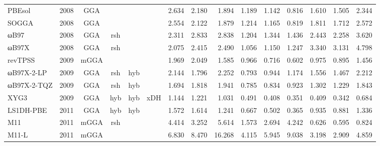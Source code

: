 \begin{landscape}
\begin{longtable}{lcccccrrrrrrrrr}
    PBEsol           & 2008 & GGA  &          &             &           & 2.634             & 2.180             & 1.894  & 1.189              & 1.142             & 0.816  & 1.610   & 1.505 & 2.344 \\
    SOGGA            & 2008 & GGA  &          &             &           & 2.554             & 2.122             & 1.879  & 1.214              & 1.165             & 0.819  & 1.811   & 1.712 & 2.572 \\
    ωB97             & 2008 & GGA  & rsh      &             &           & 2.311             & 2.833             & 2.838  & 1.204              & 1.344             & 1.436  & 2.443   & 2.258 & 3.620 \\
    ωB97X            & 2008 & GGA  & rsh      &             &           & 2.075             & 2.415             & 2.490  & 1.056              & 1.150             & 1.247  & 3.340   & 3.131 & 4.798 \\
    revTPSS          & 2009 & mGGA &          &             &           & 1.969             & 2.049             & 1.585  & 0.966              & 0.716             & 0.602  & 0.975   & 0.895 & 1.456 \\
    ωB97X-2-LP       & 2009 & GGA  & rsh      & hyb         &           & 2.144             & 1.796             & 2.252  & 0.793              & 0.944             & 1.174  & 1.556   & 1.467 & 2.212 \\
    ωB97X-2-TQZ      & 2009 & GGA  & rsh      & hyb         &           & 1.694             & 1.818             & 1.941  & 0.785              & 0.834             & 0.923  & 1.302   & 1.229 & 1.843 \\
    XYG3             & 2009 & GGA  & hyb      & hyb         & xDH       & 1.144             & 1.221             & 1.031  & 0.491              & 0.408             & 0.351  & 0.409   & 0.342 & 0.684 \\
    LS1DH-PBE        & 2011 & GGA  & hyb      & hyb         &           & 1.572             & 1.614             & 1.241  & 0.667              & 0.502             & 0.365  & 0.935   & 0.881 & 1.336 \\
    M11              & 2011 & mGGA & rsh      &             &           & 4.414             & 3.252             & 5.614  & 1.573              & 2.694             & 4.242  & 0.626   & 0.595 & 0.824 \\
    M11-L            & 2011 & mGGA &          &             &           & 6.830             & 8.470             & 16.268 & 4.115              & 5.945             & 9.038  & 3.198   & 2.909 & 4.859 \\

\end{longtable}
\end{landscape}
